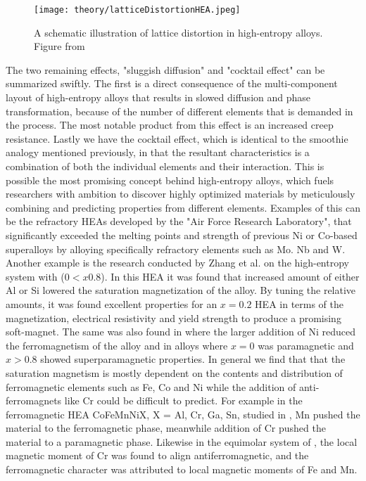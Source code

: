 \begin{figure} 
\centering
\texttt{[image: theory/latticeDistortionHEA.jpeg]}
\caption{A schematic illustration of lattice distortion in high-entropy alloys. Figure from \cite{owen_jones_2018}}
\end{figure}
 
The two remaining effects, "sluggish diffusion" and "cocktail effect" can be summarized swiftly. The first is a direct consequence of the multi-component layout of high-entropy alloys that results in slowed diffusion and phase transformation, because of the number of different elements that is demanded in the process. The most notable product from this effect is an increased creep resistance. Lastly we have the cocktail effect, which is identical to the smoothie analogy mentioned previously, in that the resultant characteristics is a combination of both the individual elements and their interaction. This is possible the most promising concept behind high-entropy alloys, which fuels researchers with ambition to discover highly optimized materials by meticulously combining and predicting properties from different elements. Examples of this can be the refractory HEAs developed by the "Air Force Research Laboratory", that significantly exceeded the melting points and strength of previous Ni or Co-based superalloys by alloying specifically refractory elements such as Mo. Nb and W. Another example is the research conducted by Zhang et al. on the high-entropy system  with ($0 < x 0.8$). In this HEA it was found that increased amount of either Al or Si lowered the saturation magnetization of the alloy. By tuning the relative amounts, it was found excellent properties for an $x=0.2$ HEA in terms of the magnetization, electrical resistivity and yield strength to produce a promising soft-magnet. The same was also found in  where the larger addition of Ni reduced the ferromagnetism of the alloy and in  alloys where $x = 0$ was paramagnetic and $x > 0.8$ showed superparamagnetic properties. In general we find that that the saturation magnetism is mostly dependent on the contents and distribution of ferromagnetic elements such as Fe, Co and Ni while the addition of anti-ferromagnets like Cr could be difficult to predict. For example in the ferromagnetic HEA CoFeMnNiX, X = Al, Cr, Ga, Sn, studied in \cite{ZUO201710}, Mn pushed the material to the ferromagnetic phase, meanwhile addition of Cr pushed the material to a paramagnetic phase. Likewise in the equimolar system of  \cite{PhysRevB.96.014437}, the local magnetic moment of Cr was found to align antiferromagnetic, and the ferromagnetic character was attributed to local magnetic moments of Fe and Mn. 